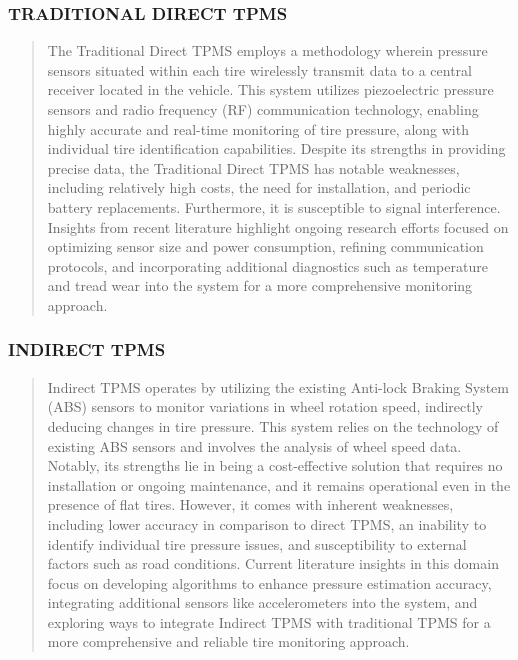 \documentclass[
]{article}
\begin{document}
\hypertarget{traditional-direct-tpms}{%
\subsubsection{TRADITIONAL DIRECT TPMS}\label{traditional-direct-tpms}}

\begin{quote}
The Traditional Direct TPMS employs a methodology wherein pressure
sensors situated within each tire wirelessly transmit data to a central
receiver located in the vehicle. This system utilizes piezoelectric
pressure sensors and radio frequency (RF) communication technology,
enabling highly accurate and real-time monitoring of tire pressure,
along with individual tire identification capabilities. Despite its
strengths in providing precise data, the Traditional Direct TPMS has
notable weaknesses, including relatively high costs, the need for
installation, and periodic battery replacements. Furthermore, it is
susceptible to signal interference. Insights from recent literature
highlight ongoing research efforts focused on optimizing sensor size and
power consumption, refining communication protocols, and incorporating
additional diagnostics such as temperature and tread wear into the
system for a more comprehensive monitoring approach.
\end{quote}

\hypertarget{indirect-tpms}{%
\subsubsection{INDIRECT TPMS}\label{indirect-tpms}}

\begin{quote}
Indirect TPMS operates by utilizing the existing Anti-lock Braking
System (ABS) sensors to monitor variations in wheel rotation speed,
indirectly deducing changes in tire pressure. This system relies on the
technology of existing ABS sensors and involves the analysis of wheel
speed data. Notably, its strengths lie in being a cost-effective
solution that requires no installation or ongoing maintenance, and it
remains operational even in the presence of flat tires. However, it
comes with inherent weaknesses, including lower accuracy in comparison
to direct TPMS, an inability to identify individual tire pressure
issues, and susceptibility to external factors such as road conditions.
Current literature insights in this domain focus on developing
algorithms to enhance pressure estimation accuracy, integrating
additional sensors like accelerometers into the system, and exploring
ways to integrate Indirect TPMS with traditional TPMS for a more
comprehensive and reliable tire monitoring approach.
\end{quote}
\end{document}
